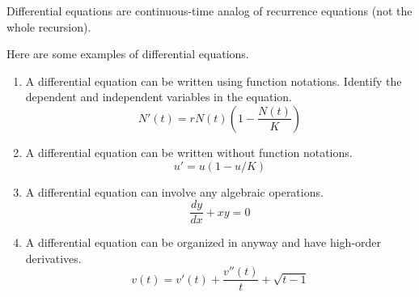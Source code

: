 \documentclass[../main.tex]{subfiles}
\begin{document}
\faStar{} Differential equations are continuous-time analog of recurrence equations (not the whole recursion).  

\begin{example}
  Here are some examples of differential equations.  

  \begin{enumerate}[wide]
    \item A differential equation can be written using function notations. Identify the dependent and independent variables in the equation.
      \begin{equation}
        N'(t) = r N(t) \left(1-\frac{N(t)}{K}\right)
      \end{equation}

    \item A differential equation can be written without function notations.
      \begin{equation}
        u' = u (1-u/K)
      \end{equation}

    \item A differential equation can involve any algebraic operations.
      \begin{equation}
        \frac{dy}{dx} + xy = 0
      \end{equation}

    \item A differential equation can be organized in anyway and have high-order derivatives.
      \begin{equation}
        v(t) = v'(t) + \frac{v''(t)}{t} + \sqrt{t-1}
      \end{equation}
  \end{enumerate}
\end{example}
\end{document}
